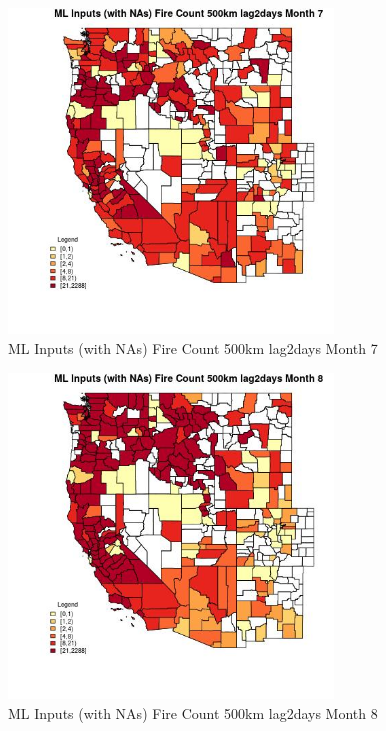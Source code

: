 \begin{figure} 
\centering  
\includegraphics[width=0.77\textwidth]{Code_Outputs/Report_ML_input_PM25_Step4_part_e_de_duplicated_aves_compiled_2019-05-21wNAs_CountyFire_Count_500km_lag2daysmedianMonth7.jpg} 
\caption{\label{fig:Report_ML_input_PM25_Step4_part_e_de_duplicated_aves_compiled_2019-05-21wNAsCountyFire_Count_500km_lag2daysmedianMonth7}ML Inputs (with NAs) Fire Count 500km lag2days Month 7} 
\end{figure} 
 

\begin{figure} 
\centering  
\includegraphics[width=0.77\textwidth]{Code_Outputs/Report_ML_input_PM25_Step4_part_e_de_duplicated_aves_compiled_2019-05-21wNAs_CountyFire_Count_500km_lag2daysmedianMonth8.jpg} 
\caption{\label{fig:Report_ML_input_PM25_Step4_part_e_de_duplicated_aves_compiled_2019-05-21wNAsCountyFire_Count_500km_lag2daysmedianMonth8}ML Inputs (with NAs) Fire Count 500km lag2days Month 8} 
\end{figure} 
 

